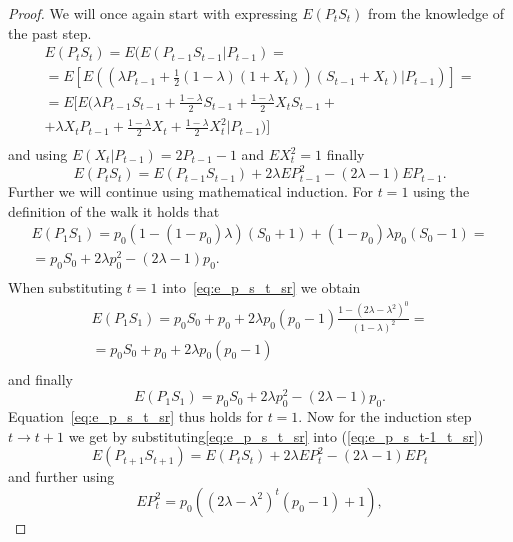 \documentclass[runningheads]{CMSIM}
\begin{document}
    \begin{proof}
        We will once again start with expressing $E(P_{t}S_{t})$ from the
        knowledge of the past step.
        \begin{gather*}
            E(P_{t}S_{t})=E(E(P_{t-1}S_{t-1}|P_{t-1})=\\
            =E[E((\lambda P_{t-1}+\frac{1}{2}(1-\lambda)(1+X_{t}))(S_{t-1}+X_{t})|P_{t-1})]=\\
            =E[E(\lambda P_{t-1}S_{t-1}+\frac{1-\lambda}{2}S_{t-1}+\frac{1-\lambda}{2}X_{t}S_{t-1}+\\
                +\lambda X_{t}P_{t-1}+\frac{1-\lambda}{2}X_{t}+\frac{1-\lambda}{2}X_{t}^{2}|P_{t-1})]\\
        \end{gather*}
        and using $E(X_{t}|P_{t-1})=2P_{t-1}-1$ and $EX_{t}^{2}=1$ finally
        \begin{equation}
            E(P_{t}S_{t})=E(P_{t-1}S_{t-1})+2\lambda EP_{t-1}^{2}-(2\lambda-1)EP_{t-1}.\label{eq:e_p_s_t-1_t_sr}
        \end{equation}
        Further we will continue using mathematical induction.
        For $t=1$
        using the definition of the walk it holds that
        \begin{gather*}
            E(P_{1}S_{1})=p_{0}(1-(1-p_{0})\lambda)(S_{0}+1)+(1-p_{0})\lambda p_{0}(S_{0}-1)=\\
            =p_{0}S_{0}+2\lambda p_{0}^{2}-(2\lambda-1)p_{0}.\\
        \end{gather*}
        When substituting $t=1$ into~\eqref{eq:e_p_s_t_sr} we obtain
        \begin{gather*}
            E(P_{1}S_{1})=p_{0}S_{0}+p_{0}+2\lambda p_{0}(p_{0}-1)\frac{1-(2\lambda-\lambda^{2})^{0}}{(1-\lambda)^{2}}=\\
            =p_{0}S_{0}+p_{0}+2\lambda p_{0}(p_{0}-1)\\
        \end{gather*}
        and finally
        \[
            E(P_{1}S_{1})=p_{0}S_{0}+2\lambda p_{0}^{2}-(2\lambda-1)p_{0}.
        \]
        Equation~\eqref{eq:e_p_s_t_sr} thus holds for $t=1$.
        Now for the
        induction step $t\rightarrow t+1$ we get by substituting\eqref{eq:e_p_s_t_sr}
        into (\ref{eq:e_p_s_t-1_t_sr})
        \[
            E(P_{t+1}S_{t+1})=E(P_{t}S_{t})+2\lambda EP_{t}^{2}-(2\lambda-1)EP_{t}
        \]
        and further using
        \[
            EP_{t}^{2}=p_{0}((2\lambda-\lambda^{2})^{t}(p_{0}-1)+1),
\]
\end{proof}
\end{document}
